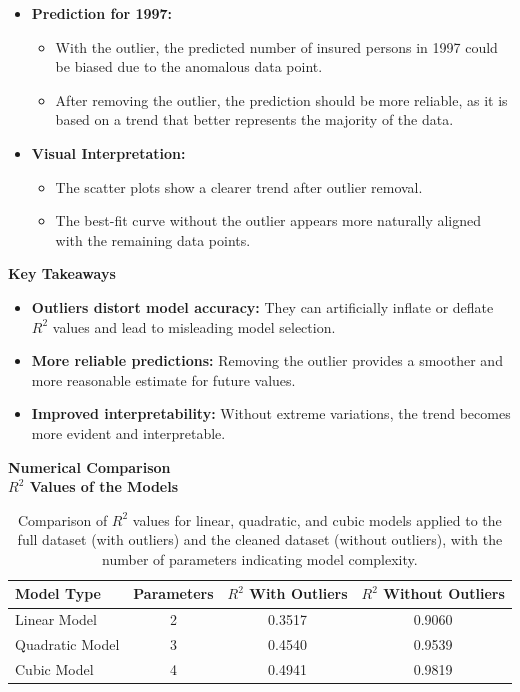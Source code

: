 \documentclass[12pt]{article}
\begin{document}
\begin{itemize}
    \item \textbf{Prediction for 1997:}
    \begin{itemize}
        \item With the outlier, the predicted number of insured persons in 1997 could be biased due to the anomalous data point.
        \item After removing the outlier, the prediction should be more reliable, as it is based on a trend that better represents the majority of the data.
    \end{itemize}
    \item \textbf{Visual Interpretation:}
    \begin{itemize}
        \item The scatter plots show a clearer trend after outlier removal.
        \item The best-fit curve without the outlier appears more naturally aligned with the remaining data points.
    \end{itemize}
\end{itemize}

\textbf{Key Takeaways}

\begin{itemize}
    \item \textbf{Outliers distort model accuracy:} They can artificially inflate or deflate \( R^2 \) values and lead to misleading model selection.
    \item \textbf{More reliable predictions:} Removing the outlier provides a smoother and more reasonable estimate for future values.
    \item \textbf{Improved interpretability:} Without extreme variations, the trend becomes more evident and interpretable.
\end{itemize}

\textbf{Numerical Comparison}\\

\textbf{\( R^2 \) Values of the Models}\\

\begin{table}[H]
    \centering
    \begin{tabular}{lccc}
        \toprule
        \textbf{Model Type} & \textbf{Parameters} & \textbf{\( R^2 \) With Outliers} & \textbf{\( R^2 \) Without Outliers} \\
        \midrule
        Linear Model    & 2 & 0.3517 & 0.9060 \\
        Quadratic Model & 3 & 0.4540 & 0.9539 \\
        Cubic Model     & 4 & 0.4941 & 0.9819 \\
        \bottomrule
    \end{tabular}
    \caption{Comparison of \( R^2 \) values for linear, quadratic, and cubic models applied to the full dataset (with outliers) and the cleaned dataset (without outliers), with the number of parameters indicating model complexity.}
    \label{tab:r2_comparison_params}
\end{table}
\end{document}
